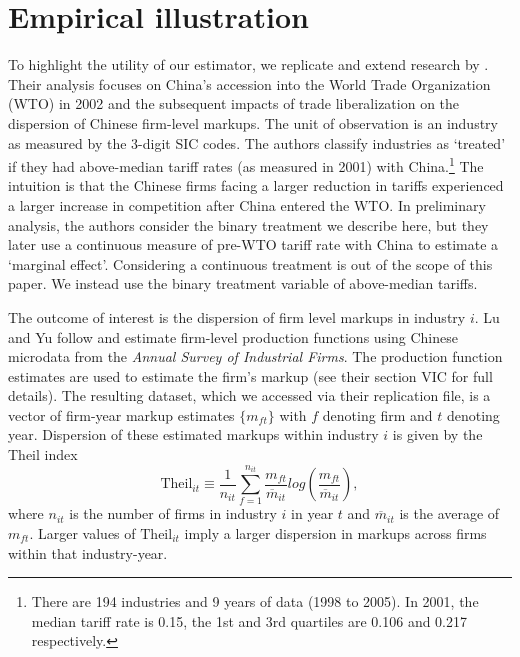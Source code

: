 \documentclass[12pt,fleqn]{article}
\begin{document}
\section{Empirical illustration}

To highlight the utility of our estimator, we replicate and extend research by \citet{lu2015trade}. Their analysis focuses on China's accession into the World Trade Organization (WTO) in 2002 and the subsequent impacts of trade liberalization on the dispersion of Chinese firm-level markups. The unit of observation is an industry as measured by the 3-digit SIC codes. The authors classify industries as `treated' if they had above-median tariff rates (as measured in 2001) with China.\footnote{There are 194 industries and 9 years of data (1998 to 2005). In 2001, the median tariff rate is 0.15, the 1st and 3rd quartiles are 0.106 and 0.217 respectively.} The intuition is that the Chinese firms facing a larger reduction in tariffs experienced a larger increase in competition after China entered the WTO. In preliminary analysis, the authors consider the binary treatment we describe here, but they later use a continuous measure of pre-WTO tariff rate with China to estimate a `marginal effect'. Considering a continuous treatment is out of the scope of this paper. We instead use the binary treatment variable of above-median tariffs. 

The outcome of interest is the dispersion of firm level markups in industry $i$. Lu and Yu follow \citet{loecker2012markups} and estimate firm-level production functions using Chinese microdata from the \emph{Annual Survey of Industrial Firms}. The production function estimates are used to estimate the firm's markup (see their section VIC for full details). The resulting dataset, which we accessed via their replication file, is a vector of firm-year markup estimates $\{ m_{ft} \}$ with $f$ denoting firm and $t$ denoting year. Dispersion of these estimated markups within industry $i$ is given by the Theil index
\begin{equation}\label{eq:theil_index}
  \text{Theil}_{it} \equiv \frac{1}{n_{it}} \sum_{f = 1}^{n_{it}} \frac{m_{ft}}{\overline{m}_{it}} log\left( \frac{m_{ft}}{\overline{m}_{it}} \right),
\end{equation}
where $n_{it}$ is the number of firms in industry $i$ in year $t$ and $\overline{m}_{it}$ is the average of $m_{ft}$. Larger values of $\text{Theil}_{it}$ imply a larger dispersion in markups across firms within that industry-year.
\end{document}
